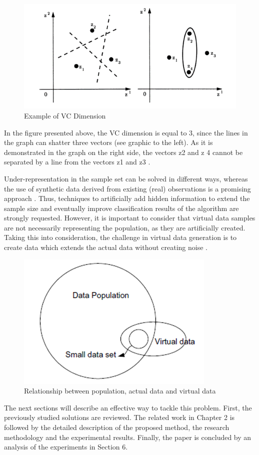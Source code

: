 \documentclass[parskip=full]{scrartcl}
\begin{document}
\begin{figure}[h]
	\centering
	\includegraphics[width=0.6\linewidth]{"./resources/vc_dimension"}
	\caption{Example of VC Dimension \cite{Vapnik.2008}}
	\label{fig:vc-dimension}
\end{figure}

In the figure presented above, the VC dimension is equal to 3, since the lines
in the graph can shatter three vectors (see graphic to the left). As it is
demonstrated in the graph on the right side, the vectors z{\tiny 2} and z{\tiny
4} cannot be separated by a line from the vectors z{\tiny 1} and z{\tiny 3}
\cite{Vapnik.2008}.

Under-representation in the sample set can be solved in different ways, whereas
the use of synthetic data derived from existing (real) observations is a
promising approach \cite{Sezer.2014}. Thus, techniques to artificially add
hidden information to extend the sample size and eventually improve
classification results of the algorithm are strongly requested. However, it is
important to consider that virtual data samples are not necessarily representing
the population, as they are artificially created. Taking this into
consideration, the challenge in virtual data generation is to create data which
extends the actual data without creating noise \cite{Li.2006}. 

\begin{figure}[h]
	\centering
	\includegraphics[width=0.35\linewidth]{./Resources/relationship}
	\caption{Relationship between population, actual data and virtual data \cite{Li.2006}}
	\label{fig:relationship}
\end{figure}

The next sections will describe an effective way to tackle this problem. First,
the previously studied solutions are reviewed. The related work in Chapter 2 is
followed by the detailed description of the proposed method, the research
methodology and the experimental results. Finally, the paper is concluded by an
analysis of the experiments in Section 6.
\end{document}
